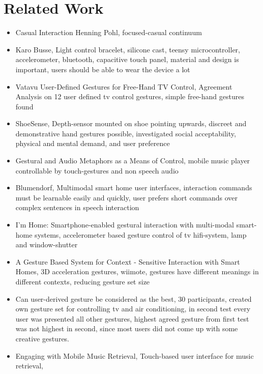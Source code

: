\chapter{Related Work}\label{ch:relatedwork}

\begin{itemize}
\item{
	Casual Interaction Henning Pohl, focused-casual continuum
}
\item{
	Karo Busse, Light control bracelet,
	silicone cast, teensy microcontroller, accelerometer, bluetooth, capacitive touch panel,
	material and design is important, users should be able to wear the device a lot
}
\item{
	Vatavu User-Defined Gestures for Free-Hand TV Control,
	Agreement Analysis on 12 user defined tv control gestures,
	simple free-hand gestures found
}
\item{
	ShoeSense, Depth-sensor mounted on shoe pointing upwards,
	discreet and demonstrative hand gestures possible,
	investigated social acceptability, physical and mental demand, and user preference
}
\item{
	Gestural and Audio Metaphors as a Means of Control,
	mobile music player controllable by touch-gestures and non speech audio
}
\item{
	Blumendorf, Multimodal smart home user interfaces,
	interaction commands must be learnable easily and quickly, user prefers short commands over complex sentences in speech interaction
}
\item{
	I'm Home: Smartphone-enabled gestural interaction with multi-modal smart-home systems,
	accelerometer based gesture control of tv hifi-system, lamp and window-shutter
}
\item{
	A Gesture Based System for Context - Sensitive Interaction with Smart Homes,
	3D acceleration gestures, wiimote, gestures have different meanings in different contexts, reducing gesture set size
}
\item{
	Can user-derived gesture be considered as the best,
	30 participants, created own gesture set for controlling tv and air conditioning, in second test every user was presented all other gestures, highest agreed gesture from first test was not highest in second, since most users did not come up with some creative gestures.
}
\item{
	Engaging with Mobile Music Retrieval,
	Touch-based user interface for music retrieval,
}

\end{itemize}

